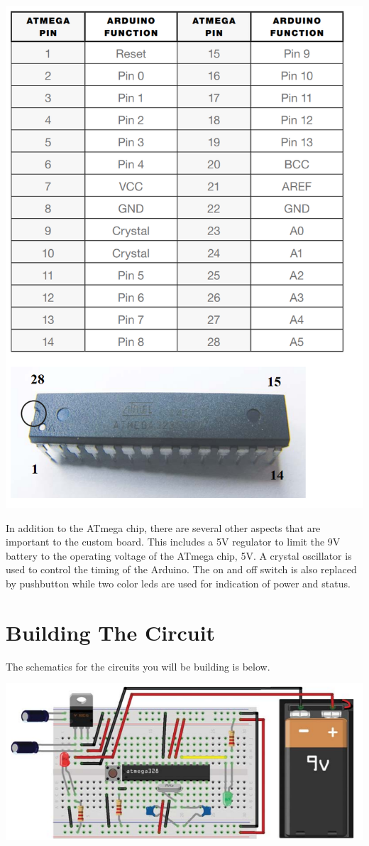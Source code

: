 \documentclass[11pt]{article}
\begin{document}
\centerline{
	\includegraphics[scale=1]{exp10-pin}	
}

In addition to the ATmega chip, there are several other aspects that are important to the custom board. This includes a 5V regulator to limit the 9V battery to the operating voltage of the ATmega chip, 5V. A crystal oscillator is used to control the timing of the Arduino. The on and off switch is also replaced by pushbutton while two color leds are used for indication of power and status.

\section{Building The Circuit}
\label{sec-3}

The schematics for the circuits you will be building is below.

\centerline{
	\includegraphics[scale=2]{exp10-schematics}	
}
\end{document}

